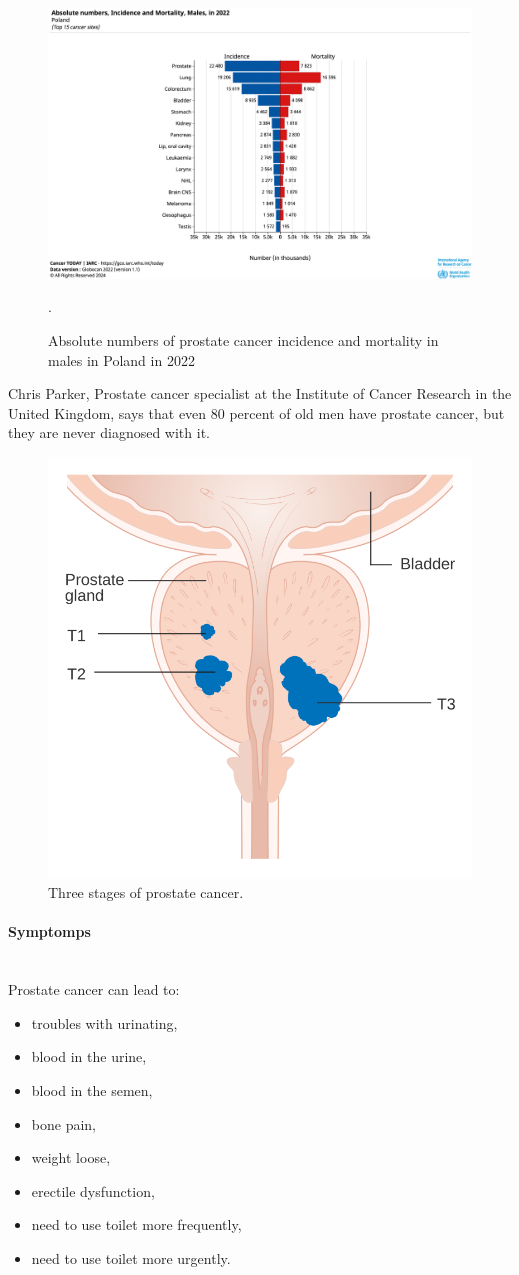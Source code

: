\begin{figure}[H]
    \centering
    \includegraphics[width=0.5\linewidth]{background/graphic-absolute-numbers-inc-and-mort-males-in-2022-poland.png}
    \caption{Absolute numbers of prostate cancer incidence and mortality in males in Poland in 2022\cite{gco_cancer_today}}.
    \label{fig:prostate-cancer-occurences}
\end{figure}

Chris Parker, Prostate cancer specialist at the Institute of Cancer Research in the United Kingdom, says that even 80 percent of old men have prostate cancer, but they are never diagnosed with it\cite{nhs_choices_2024}. 


\begin{figure}[H]
    \centering
    \includegraphics[width=0.5\linewidth]{background/Diagram_showing_T1-3_stages_of_prostate_cancer_CRUK_278.svg.png}
    \caption{Three stages of prostate cancer\cite{pc-stages}.}
    \label{fig:prostate-cancer-stages}
\end{figure}

\paragraph{Symptomps}\mbox{} \\

Prostate cancer can lead to\cite{prostate-cancer-symptomsandcauses_2024}\cite{nhs_choices_2024}:
\begin{itemize}
    \item troubles with urinating,
    \item blood in the urine,
    \item blood in the semen,
    \item bone pain,
    \item weight loose,
    \item erectile dysfunction,
    \item need to use toilet more frequently,
    \item need to use toilet more urgently.
\end{itemize}

